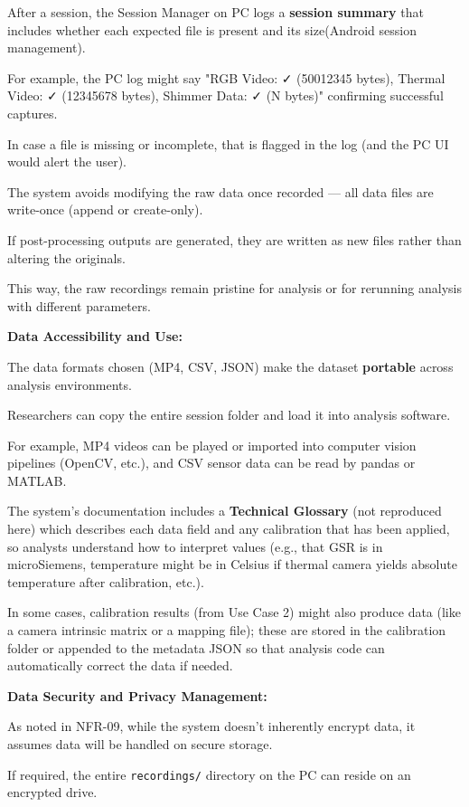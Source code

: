 After a session, the Session Manager on PC logs a \textbf{session summary}
 that includes whether each expected file is present and its size(Android session management).

For example, the PC log might say "RGB Video: ✓ (50012345 bytes), Thermal Video: ✓ (12345678 bytes), Shimmer Data: ✓ (N bytes)" confirming successful captures.

In case a file is missing or incomplete, that is flagged in the log (and the PC UI would alert the user).

The system avoids modifying the raw data once recorded --- all data files are write-once (append or create-only).

If post-processing outputs are generated, they are written as new files rather than altering the originals.

This way, the raw recordings remain pristine for analysis or for rerunning analysis with different parameters.

\textbf{Data Accessibility and Use:}

The data formats chosen (MP4, CSV, JSON) make the dataset \textbf{portable}
 across analysis environments.

Researchers can copy the entire session folder and load it into analysis software.

For example, MP4 videos can be played or imported into computer vision pipelines (OpenCV, etc.), and CSV sensor data can be read by pandas or MATLAB.

The system's documentation includes a \textbf{Technical Glossary}
 (not reproduced here) which describes each data field and any calibration that has been applied, so analysts understand how to interpret values (e.g., that GSR is in microSiemens, temperature might be in Celsius if thermal camera yields absolute temperature after calibration, etc.).

In some cases, calibration results (from Use Case 2) might also produce data (like a camera intrinsic matrix or a mapping file); these are stored in the calibration folder or appended to the metadata JSON so that analysis code can automatically correct the data if needed.

\textbf{Data Security and Privacy Management:}

As noted in NFR-09, while the system doesn't inherently encrypt data, it assumes data will be handled on secure storage.

If required, the entire \texttt{recordings/} directory on the PC can reside on an encrypted drive.

